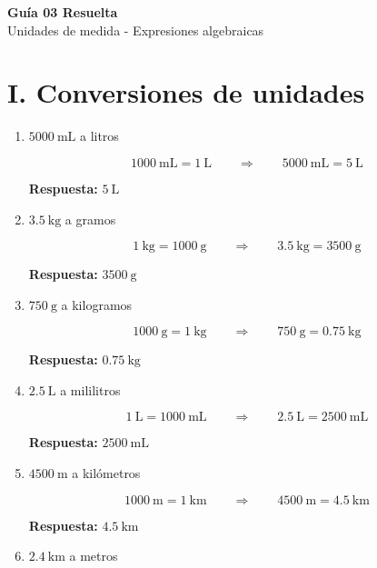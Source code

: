 \documentclass[12pt]{article}
\begin{document}
	
	\vspace*{1em}
	
	\begin{center}
		{\Large \textbf{Guía 03 Resuelta}}\\[0.3em]
		{\small Unidades de medida - Expresiones algebraicas}
	\end{center}
	
	\section*{I. Conversiones de unidades}
	
	\begin{enumerate}[itemsep=0.4cm]
		\item $5000\ \text{mL}$ a litros
		
		\[
		1000\ \text{mL} = 1\ \text{L}
		\qquad\Rightarrow\qquad
		5000\ \text{mL} = 5\ \text{L}
		\]
		
		\textbf{Respuesta:} $5\ \text{L}$
		
		\item $3.5\ \text{kg}$ a gramos
		
		\[
		1\ \text{kg} = 1000\ \text{g}
		\qquad\Rightarrow\qquad
		3.5\ \text{kg} = 3500\ \text{g}
		\]
		
		\textbf{Respuesta:} $3500\ \text{g}$
		
		\item $750\ \text{g}$ a kilogramos
		
		\[
		1000\ \text{g} = 1\ \text{kg}
		\qquad\Rightarrow\qquad
		750\ \text{g} = 0.75\ \text{kg}
		\]
		
		\textbf{Respuesta:} $0.75\ \text{kg}$
		
		\item $2.5\ \text{L}$ a mililitros
		
		\[
		1\ \text{L} = 1000\ \text{mL}
		\qquad\Rightarrow\qquad
		2.5\ \text{L} = 2500\ \text{mL}
		\]
		
		\textbf{Respuesta:} $2500\ \text{mL}$
		
		\item $4500\ \text{m}$ a kilómetros
		
		\[
		1000\ \text{m} = 1\ \text{km}
		\qquad\Rightarrow\qquad
		4500\ \text{m} = 4.5\ \text{km}
		\]
		
		\textbf{Respuesta:} $4.5\ \text{km}$
		
		\item $2.4\ \text{km}$ a metros
		

\end{enumerate}
\end{document}
